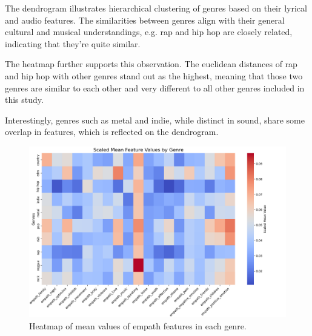 The dendrogram illustrates hierarchical clustering of genres based on their
lyrical and audio features. The similarities between genres align with their
general cultural and musical understandings, e.g. rap and hip hop are closely
related, indicating that they're quite similar. 

The heatmap further supports this observation. The euclidean distances of rap
and hip hop with other genres stand out as the highest, meaning that those two
genres are similar to each other and very different to all other genres
included in this study. 

Interestingly, genres such as metal and indie, while
distinct in sound, share some overlap in features, which is reflected on the
dendrogram.


\begin{center}
\begin{figure}[H]
  \centering
  \includegraphics[width=6in]{img/heatmap_of_empath.png}
  \caption{Heatmap of mean values of empath features in each genre.}
  \label{Figure:heatmap_empath}
\end{figure}
\end{center}


